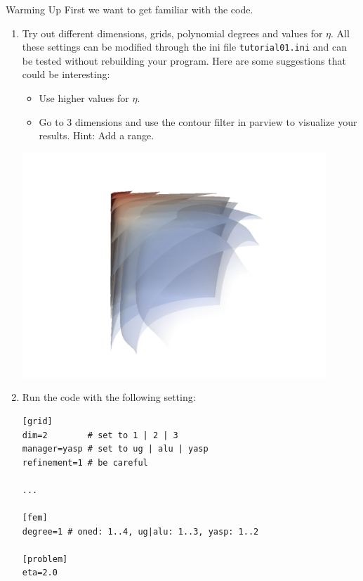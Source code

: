 \documentclass[12pt,a4paper]{article}
\begin{document}
\begin{Exercise}{Warming Up}
  First we want to get familiar with the code.
  \begin{enumerate}
  \item Try out different dimensions, grids, polynomial degrees and
    values for $\eta$.  All these settings can be modified through the
    ini file \lstinline{tutorial01.ini} and can be tested without
    rebuilding your program.  Here are some suggestions that could be
    interesting:
    \begin{itemize}
    \item Use higher values for $\eta$.
    \item Go to 3 dimensions and use the contour filter in parview to
      visualize your results.  Hint: Add a range.
    \end{itemize}
      \begin{center}
        \includegraphics[width=0.9\textwidth]{nonlinear_poisson_contour.png}
      \end{center}

  \item Run the code with the following setting:
    \begin{lstlisting}
[grid]
dim=2        # set to 1 | 2 | 3
manager=yasp # set to ug | alu | yasp
refinement=1 # be careful

...

[fem]
degree=1 # oned: 1..4, ug|alu: 1..3, yasp: 1..2

[problem]
eta=2.0


\end{lstlisting}
\end{enumerate}
\end{Exercise}
\end{document}
